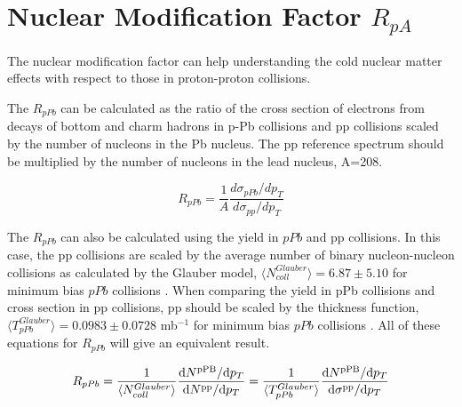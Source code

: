 

\section{Nuclear Modification Factor $R_{pA}$}
The nuclear modification factor can help understanding the cold nuclear matter effects with respect to those in proton-proton collisions. 

The $R_{pPb}$ can be calculated as the ratio of the cross section of electrons from decays of bottom and charm hadrons in p-Pb collisions and pp collisions scaled by the number of nucleons in the Pb nucleus.
The pp reference spectrum should be multiplied by the number of nucleons in the lead nucleus, A=208.

\begin{equation}\label{eqn:RpPb}
R_{pPb} =  \frac{1}{A} \frac{d\sigma_{pPb}/dp_{T}}{d\sigma_{pp}/dp_{T}} 
\end{equation}

The $R_{pPb}$ can also be calculated using the yield in $pPb$ and pp collisions. In this case, the pp collisions are scaled by the average number of binary nucleon-nucleon collisions as calculated by the Glauber model, $\langle N^{Glauber}_{coll} \rangle = 6.87 \pm 5.10$ for minimum bias $pPb$ collisions \cite{Adam:2014qja}. When comparing the yield in pPb collisions and cross section in pp collisions, pp should be scaled by the thickness function, $\langle T^{Glauber}_{pPb} \rangle = 0.0983 \pm 0.0728$ mb$^{-1}$ for minimum bias $pPb$ collisions \cite{Adam:2014qja}. All of these equations for $R_{pPb}$ will give an equivalent result. 

\begin{equation}\label{eqn:QNcoll}
R_{pPb} =  \frac{1}{\langle N^{Glauber}_{coll} \rangle} \frac{ \textnormal{d} N^{ \textnormal{pPB} }  / \textnormal{d}p_{T} }{\textnormal{d} N^{ \textnormal{pp} } / \textnormal{d}p_{T} } =  \frac{1}{\langle T^{Glauber}_{pPb} \rangle} \frac{ \textnormal{d} N^{ \textnormal{pPB} } / \textnormal{d}p_{T} }{\textnormal{d} \sigma^{ \textnormal{pp} } / \textnormal{d}p_{T} } 
\end{equation}


